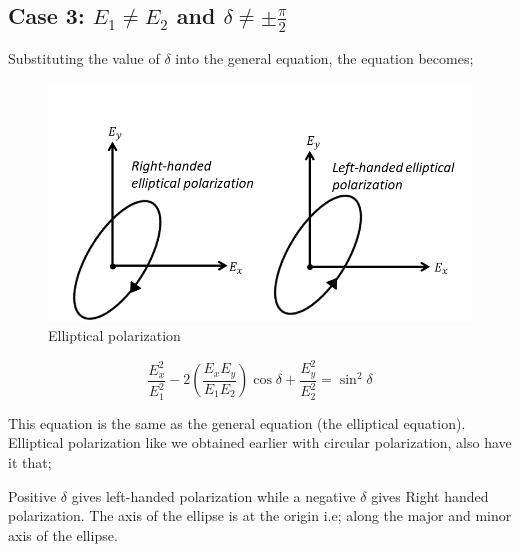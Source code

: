 \subsection{Case 3: \texorpdfstring{$E_1\neq E_2$}{E1≠E2} and \texorpdfstring{$\delta\neq\pm\frac{\pi}{2}$}{δ≠𝜆/2}}
Substituting the value of $\delta$ into the general equation, the equation becomes;
\begin{figure}[h]
\centering
\includegraphics[width=1\linewidth]{./graphics/elliptical_polarization}
\caption{Elliptical polarization}
\end{figure}

\begin{equation}
\frac{E_{x}^2}{E_{1}^2} -2(\frac{E_{x}E_{y}}{E_{1}E_{2}})\cos\delta + \frac{E_{y}^2}{E_{2}^2} =\sin^2 \delta
\end{equation}

This equation is the same as the general equation (the elliptical equation). Elliptical polarization like we obtained earlier with circular polarization, also have it that;

Positive $\delta$ gives left-handed polarization while a negative $\delta$ gives Right handed polarization. The axis of the ellipse is at the origin i.e; along the major and minor axis of the ellipse.

